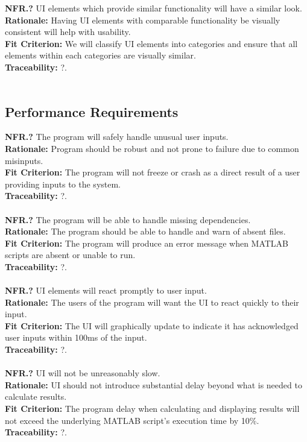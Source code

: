\documentclass[12pt]{article}
\begin{document}
  \noindent\textbf{NFR.?} UI elements which provide similar functionality will have a similar look.\\
  \textbf{Rationale:} Having UI elements with comparable functionality be visually consistent will help with usability.\\
  \textbf{Fit Criterion:} We will classify UI elements into categories and ensure that all elements within each categories are visually similar.\\
  \textbf{Traceability:} ?.\\\\

\subsection{Performance Requirements}

  \textbf{NFR.?} The program will safely handle unusual user inputs.\\
  \textbf{Rationale:} Program should be robust and not prone to failure due to common misinputs.\\
  \textbf{Fit Criterion:} The program will not freeze or crash as a direct result of a user providing inputs to the system.\\
  \textbf{Traceability:} ?.\\\\

  \noindent\textbf{NFR.?} The program will be able to handle missing dependencies.\\
  \textbf{Rationale:} The program should be able to handle and warn of absent files.\\
  \textbf{Fit Criterion:} The program will produce an error message when MATLAB scripts are absent or unable to run.\\
  \textbf{Traceability:} ?.\\\\

  \noindent\textbf{NFR.?} UI elements will react promptly to user input.\\
  \textbf{Rationale:} The users of the program will want the UI to react quickly to their input.\\
  \textbf{Fit Criterion:} The UI will graphically update to indicate it has acknowledged user inputs within 100ms of the input.\\
  \textbf{Traceability:} ?.\\\\

  \noindent\textbf{NFR.?} UI will not be unreasonably slow.\\
  \textbf{Rationale:} UI should not introduce substantial delay beyond what is needed to calculate results.\\
  \textbf{Fit Criterion:} The program delay when calculating and displaying results will not exceed the underlying MATLAB script's execution time by 10\%.\\
  \textbf{Traceability:} ?.\\\\
\end{document}
